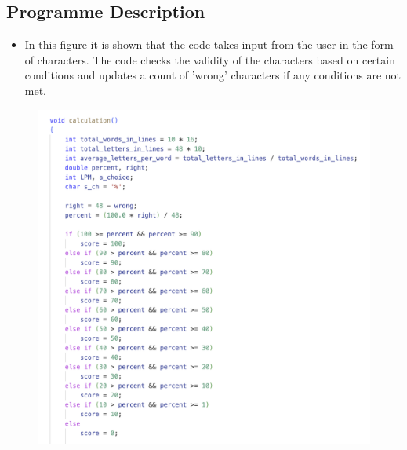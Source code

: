 \subsection{Programme Description}
 \begin{itemize}
        \item In this figure it is shown that the code  takes input from the user in the form of characters. The code checks the validity of the characters based on certain conditions and updates a count of 'wrong' characters if any conditions are not met.
\end{itemize}



\newpage
\begin{figure}[h]
     \includegraphics[scale=0.20]{CodeScreenShot/calcu-1.png}

\end{figure}
